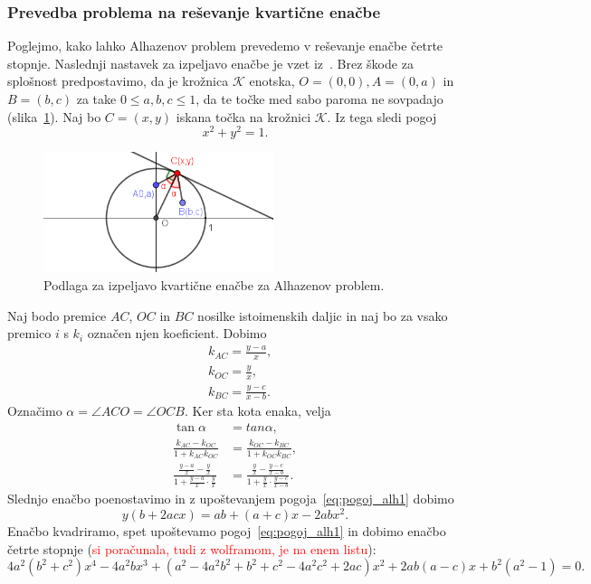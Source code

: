 \subsubsection*{Prevedba problema na reševanje kvartične enačbe}

Poglejmo, kako lahko Alhazenov problem prevedemo v reševanje enačbe četrte stopnje. Naslednji nastavek za izpeljavo enačbe je vzet iz~\cite[138--139]{geometricconstructions}. Brez škode za splošnost predpostavimo, da je krožnica $\mathcal{K}$ enotska, $O = (0,0), A = (0,a)$ in $B=(b,c)$ za take $0 \leq a, b, c \leq 1$, da te točke med sabo paroma ne sovpadajo (slika~\ref{fig:alhazen2}). Naj bo $C=(x,y)$ iskana točka na krožnici $\mathcal{K}$. Iz tega sledi pogoj
\begin{equation}
    \label{eq:pogoj_alh1}
    x^2 + y^2 = 1.
\end{equation}

\begin{figure}[h]
    \centering
    \includegraphics[width=0.6\textwidth]{images/alhazen/alhazen2.png}
    \caption[Alhazenov problem -- izpeljava]{Podlaga za izpeljavo kvartične enačbe za Alhazenov problem.}
    \label{fig:alhazen2}
\end{figure}

Naj bodo premice $AC$, $OC$ in $BC$ nosilke istoimenskih daljic in naj bo za vsako premico $i$ s $k_i$ označen njen koeficient. Dobimo
\begin{align*}
    &k_{AC} = \frac{y-a}{x}, \\
    &k_{OC} = \frac{y}{x}, \\
    &k_{BC} = \frac{y-c}{x-b}.
\end{align*}
Označimo $\alpha = \angle ACO = \angle OCB$. Ker sta kota enaka, velja
\begin{align*}
    \tan \alpha &= tan \alpha, \\
    \frac{k_{AC} - k_{OC}}{1 + k_{AC} k_{OC}} &= \frac{k_{OC} - k_{BC}}{1 + k_{OC} k_{BC}}, \\
    \frac{\frac{y-a}{x} - \frac{y}{x}}{1 + \frac{y-a}{x} \cdot \frac{y}{x}} &= \frac{\frac{y}{x} - \frac{y-c}{x-b}}{1 + \frac{y}{x} \cdot \frac{y-c}{x-b}}.
\end{align*}
Slednjo enačbo poenostavimo in z upoštevanjem pogoja~\ref{eq:pogoj_alh1} dobimo
$$ y(b + 2acx) = ab + (a+c)x - 2abx^2.$$
Enačbo kvadriramo, spet upoštevamo pogoj~\ref{eq:pogoj_alh1} in dobimo enačbo četrte stopnje (\textcolor{red}{si poračunala, tudi z wolframom, je na enem listu}):
$$ 4a^2(b^2 + c^2)x^4 - 4a^2bx^3 + (a^2 - 4a^2b^2 + b^2 + c^2 - 4a^2c^2 + 2ac)x^2 + 2ab(a-c)x + b^2(a^2-1) = 0.$$

